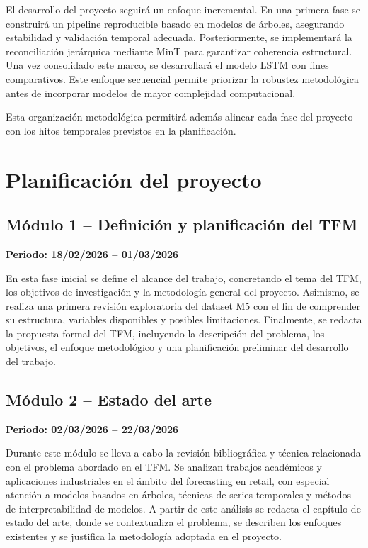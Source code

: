 \documentclass[IB,BIB]{TFUOC}%
\begin{document}
El desarrollo del proyecto seguirá un enfoque incremental. En una
primera fase se construirá un pipeline reproducible basado en modelos de
árboles, asegurando estabilidad y validación temporal adecuada.
Posteriormente, se implementará la reconciliación jerárquica mediante
MinT para garantizar coherencia estructural. Una vez consolidado este
marco, se desarrollará el modelo LSTM con fines comparativos. Este
enfoque secuencial permite priorizar la robustez metodológica antes de
incorporar modelos de mayor complejidad computacional.

Esta organización metodológica permitirá además alinear cada fase del
proyecto con los hitos temporales previstos en la planificación.

\newpage
\section{Planificación del proyecto}

\subsection{Módulo 1 -- Definición y planificación del TFM}

\textbf{Periodo: 18/02/2026 -- 01/03/2026}

En esta fase inicial se define el alcance del trabajo, concretando el
tema del TFM, los objetivos de investigación y la metodología general
del proyecto. Asimismo, se realiza una primera revisión exploratoria del
dataset M5 con el fin de comprender su estructura, variables disponibles
y posibles limitaciones. Finalmente, se redacta la propuesta formal del
TFM, incluyendo la descripción del problema, los objetivos, el enfoque
metodológico y una planificación preliminar del desarrollo del trabajo.

\subsection{Módulo 2 -- Estado del arte}

\textbf{Periodo: 02/03/2026 -- 22/03/2026}

Durante este módulo se lleva a cabo la revisión bibliográfica y técnica
relacionada con el problema abordado en el TFM. Se analizan trabajos
académicos y aplicaciones industriales en el ámbito del forecasting en
retail, con especial atención a modelos basados en árboles, técnicas de
series temporales y métodos de interpretabilidad de modelos. A partir de
este análisis se redacta el capítulo de estado del arte, donde se
contextualiza el problema, se describen los enfoques existentes y se
justifica la metodología adoptada en el proyecto.
\end{document}
